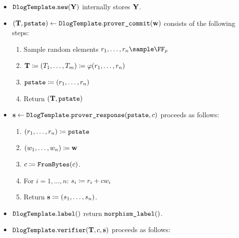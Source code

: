 \documentclass[11pt]{article}
\begin{document}
\begin{itemize}
  \item $\texttt{DlogTemplate}.\texttt{new}(\mathbf{Y})$ internally stores $\mathbf{Y}$.
  \item\label{item:basic:p1}
   $(\mathbf {T}, \texttt{pstate}) \gets \texttt{DlogTemplate}.\texttt{prover\_commit}(\mathbf {w})$ consists of the following steps:
    \begin{enumerate}
      \item\label{item:basic:p1:randomness}
        Sample random elements $\randomness_1,\dots,\randomness_n\sample\FF_p$
      \item
         $\mathbf {T} \coloneqq (T_1,\dots,T_m)\coloneqq\varphi(r_1,\dots,r_n)$
      \item $\texttt{pstate}\coloneqq (r_1,\dots,r_n)$
      \item
        Return $(\mathbf {T},\texttt{pstate})$
    \end{enumerate}
  \item\label{item:basic:p2}
    $\mathbf {s} \gets \texttt{DlogTemplate}.\texttt{prover\_response}(\texttt{pstate},c)$ proceeds as follows:
    \begin{enumerate}
      \item  $(r_1,\dots,r_n)\coloneqq \texttt{pstate}$
      \item  $(w_1,\dots,w_n)\coloneqq \mathbf {w}$
      \item
        $c \coloneqq \texttt{FromBytes}(c)$.
      \item For $i=1,\dots,n$: $s_i\coloneqq r_i+c w_i$
			\item Return $\mathbf{s} \coloneqq (s_1,\dots,s_n)$.
    \end{enumerate}
  \item $\texttt{DlogTemplate}.\texttt{label}()$ return $\texttt{morphism\_label}()$.
  \item\label{item:basic:v}
     $\texttt{DlogTemplate}.\texttt{verifier}(\mathbf {T},c,\mathbf {s})$ proceeds as follows:
    \begin{enumerate}

\end{enumerate}
\end{itemize}
\end{document}
